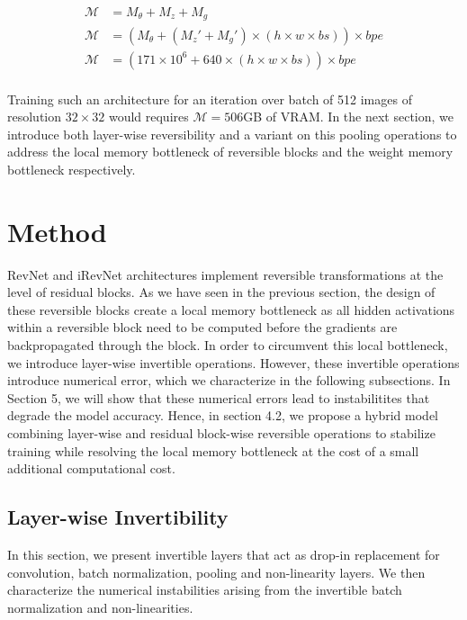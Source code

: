 \documentclass[twocolumn]{bmcart}
\begin{document}
\begin{subequations}
\begin{align}
\mathcal{M} &= M_{\theta} + M_{z} + M_{g} \\
\mathcal{M} &= (M_{\theta} + (M_z' + M_{g}') \times (h \times w \times bs)) \times bpe \\
\mathcal{M} &= (171 \times 10^6 + 640 \times (h \times w \times bs)) \times bpe \\
\end{align}
\end{subequations}

Training such an architecture for an iteration over batch of 512 images of resolution $32 \times 32$ would requires $\mathcal{M}=506$GB of VRAM. 
In the next section, we introduce both layer-wise reversibility and a variant on this pooling operations to address the local memory bottleneck 
of reversible blocks and the weight memory bottleneck respectively.

\section{Method}

RevNet and iRevNet architectures implement reversible transformations at the level of residual blocks. 
As we have seen in the previous section, the design of these reversible blocks create a local memory bottleneck as all hidden activations within a reversible block need to be computed before the gradients are backpropagated through the block. 
In order to circumvent this local bottleneck, we introduce layer-wise invertible operations. 
However, these invertible operations introduce numerical error, which we characterize in the following subsections. 
In Section 5, we will show that these numerical errors lead to instabilitites that degrade the model accuracy. 
Hence, in section 4.2, we propose a hybrid model combining layer-wise and residual block-wise reversible operations to stabilize training while resolving the local memory bottleneck at the cost of a small additional computational cost.

\subsection{Layer-wise Invertibility}

In this section, we present invertible layers that act as drop-in replacement for convolution, batch normalization, pooling and non-linearity layers. We then characterize the numerical instabilities arising from the invertible batch normalization and non-linearities.
\end{document}
